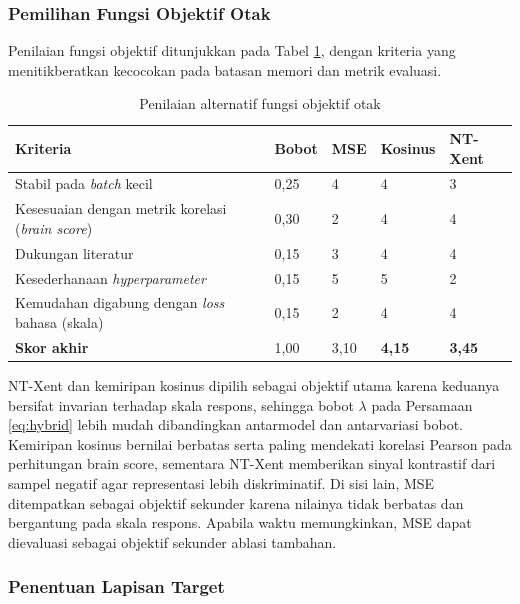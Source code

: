   \subsubsection{Pemilihan Fungsi Objektif Otak}

  Penilaian fungsi objektif ditunjukkan pada Tabel \ref{tab:am_skor_objektif}, dengan kriteria yang menitikberatkan kecocokan pada batasan memori dan metrik evaluasi.

  \begin{table}[h]
    \centering
    \caption{Penilaian alternatif fungsi objektif otak}
    \label{tab:am_skor_objektif}
    \small
    \begin{tabularx}{\textwidth}{p{6.2cm} | X | X | X | X}
      \hline
      \textbf{Kriteria} & \textbf{Bobot} & \textbf{MSE} & \textbf{Kosinus} & \textbf{NT-Xent} \\
      \hline
      Stabil pada \textit{batch} kecil & 0,25 & 4 & 4 & 3 \\
      Kesesuaian dengan metrik korelasi (\textit{brain score}) & 0,30 & 2 & 4 & 4 \\
      Dukungan literatur & 0,15 & 3 & 4 & 4 \\
      Kesederhanaan \textit{hyperparameter} & 0,15 & 5 & 5 & 2 \\
      Kemudahan digabung dengan \textit{loss} bahasa (skala) & 0,15 & 2 & 4 & 4 \\
      \hline
      \textbf{Skor akhir} & 1,00 & 3,10 & \textbf{4,15} & \textbf{3,45} \\
      \hline
    \end{tabularx}
  \end{table}

  NT-Xent dan kemiripan kosinus dipilih sebagai objektif utama karena keduanya bersifat invarian terhadap skala respons, sehingga bobot $\lambda$ pada Persamaan \ref{eq:hybrid} lebih mudah dibandingkan antarmodel dan antarvariasi bobot. Kemiripan kosinus bernilai berbatas serta paling mendekati korelasi Pearson pada perhitungan brain score, sementara NT-Xent memberikan sinyal kontrastif dari sampel negatif agar representasi lebih diskriminatif. Di sisi lain, MSE ditempatkan sebagai objektif sekunder karena nilainya tidak berbatas dan bergantung pada skala respons. Apabila waktu memungkinkan, MSE dapat dievaluasi sebagai objektif sekunder ablasi tambahan.

  \subsubsection{Penentuan Lapisan Target}

